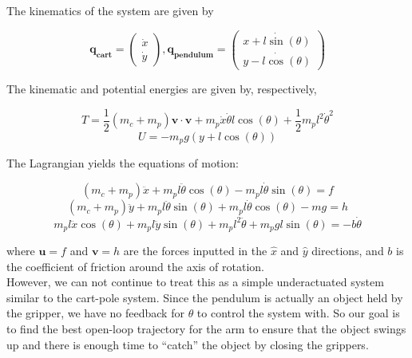 \documentclass{article}
\begin{document}
The kinematics of the system are given by 

\begin{equation}\label{eq:state}
\mathbf{q_{cart}} = \begin{pmatrix} \dot{x} \\ \dot{y} \end{pmatrix}, \mathbf{q_{pendulum}} = \begin{pmatrix} \dot{x+l\sin(\theta)} \\ \dot{y-l\cos(\theta)} \end{pmatrix}
\end{equation}

The kinematic and potential energies are given by, respectively, 

\begin{equation}\label{eq:kinetic}
T = \frac{1}{2} (m_c + m_p) \mathbf{v} \cdot \mathbf{v} + m_p\dot{x}\dot{\theta}l\cos(\theta) + \frac{1}{2}m_pl^2\dot{\theta}^2
\end{equation}
\begin{equation}\label{eq:potential}
U = -m_pg(y+l\cos(\theta))
\end{equation}

The Lagrangian yields the equations of motion:

\begin{equation}\label{eq:x_motion}
(m_c+m_p)\ddot{x} + m_pl\ddot{\theta}\cos(\theta) - m_pl\dot{\theta}\sin(\theta) = f
\end{equation}
\begin{equation}\label{eq:y_motion}
(m_c+m_p)\ddot{y} + m_pl\ddot{\theta}\sin(\theta) + m_pl\dot{\theta}\cos(\theta) - mg = h
\end{equation}
\begin{equation}\label{eq:theta_motion}
m_pl\ddot{x}\cos(\theta) + m_pl\ddot{y}\sin(\theta) + m_pl^2\ddot{\theta} + m_pgl\sin(\theta) = -b\dot{\theta}
\end{equation}

where $\mathbf{u} = f$ and $\mathbf{v} = h$ are the forces inputted in the $\hat{x}$ and $\hat{y}$ directions, and $b$ is the coefficient of friction around the axis of rotation. \\

However, we can not continue to treat this as a simple underactuated
system similar to the cart-pole system. Since the pendulum is actually
an object held by the gripper, we have no feedback for $\theta$ to
control the system with. So our goal is to find the best open-loop
trajectory for the arm to ensure that the object swings up and there
is enough time to ``catch'' the object by closing the grippers.
\end{document}
